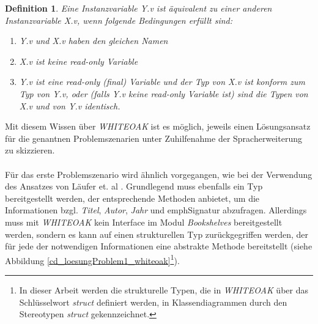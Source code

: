 \documentclass[11pt, 
ngerman,
doublespacing,
chapterinoneline, %
consistentlayout, %
]{scrartcl}
\newtheorem{definition}{Definition}
\begin{document}
\begin{definition}\label{def_equiVarWHITEOAK}
Eine Instanzvariable \emph{Y.v} ist äquivalent zu einer anderen Instanzvariable \emph{X.v}, wenn folgende Bedingungen erfüllt sind:
\begin{enumerate}
\item \emph{Y.v} und \emph{X.v} haben den gleichen Namen
\item \emph{X.v} ist keine read-only Variable
\item \emph{Y.v} ist eine read-only (final) Variable und der Typ von \emph{X.v} ist konform zum Typ von \emph{Y.v}, oder (falls \emph{Y.v} keine read-only Variable ist) sind die Typen von \emph{X.v} und von \emph{Y.v} identisch. 
\end{enumerate}
\end{definition}
Mit diesem Wissen über \emph{WHITEOAK} ist es möglich, jeweils einen Lösungsansatz für die genantnen Problemszenarien unter Zuhilfenahme der Spracherweiterung zu skizzieren.\\\\
Für das erste Problemszenario wird ähnlich vorgegangen, wie bei der Verwendung des Ansatzes von Läufer et. al \cite{structconfjava}. Grundlegend muss ebenfalls ein Typ bereitgestellt werden, der entsprechende Methoden anbietet, um die Informationen bzgl. \emph{Titel}, \emph{Autor}, \emph{Jahr} und emph{Signatur} abzufragen. 
Allerdings muss mit \emph{WHITEOAK} kein Interface im Modul \emph{Bookshelves} bereitgestellt werden, sondern es kann auf einen strukturellen Typ zurückgegriffen werden, der für jede der notwendigen Informationen eine abstrakte Metho\-de bereitstellt (siehe Abbildung \ref{cd_loesungProblem1_whiteoak}\footnote{In dieser Arbeit werden die strukturelle Typen, die in \emph{WHITEOAK} über das Schlüsselwort \emph{struct} definiert werden, in Klassendiagrammen durch den Stereotypen \emph{struct} gekennzeichnet.}).
\end{document}
